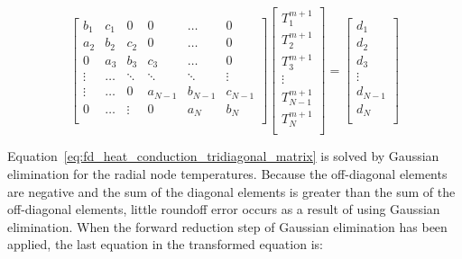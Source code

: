 \begin{equation}
    \label{eq:fd_heat_conduction_tridiagonal_matrix}
    \begin{bmatrix}
        b_{1}   &   c_{1}   &   0       &  0        &   \dots     &   0         \\
        a_{2}   &   b_{2}   &   c_{2}   &  0        &   \dots     &   0         \\
        0       &   a_{3}   &   b_{3}   &  c_{3}    &   \dots     &   0         \\
        \vdots  &   \hdots  &   \ddots  &  \ddots   &   \ddots    &   \vdots    \\
        \vdots  &   \hdots  &   0       &  a_{N-1}  &   b_{N-1}   &   c_{N-1}   \\
        0       &   \hdots  &   \vdots  &   0       &   a_{N}     &     b_{N}   \\  
    \end{bmatrix}
    \begin{bmatrix}
        T_{1}^{m+1}         \\
        T_{2}^{m+1}         \\
        T_{3}^{m+1}         \\
        \vdots              \\
        T_{N-1}^{m+1}       \\
        T_{N}^{m+1}         \\
    \end{bmatrix}
    =
    \begin{bmatrix}
        d_{1}               \\
        d_{2}               \\
        d_{3}               \\
        \vdots              \\
        d_{N-1}             \\
        d_{N}               \\
    \end{bmatrix}
\end{equation}

Equation~\ref{eq:fd_heat_conduction_tridiagonal_matrix} is solved by Gaussian elimination for the
radial node temperatures. Because the off-diagonal elements are negative and the sum of the diagonal
elements is greater than the sum of the off-diagonal elements, little roundoff error occurs as a
result of using Gaussian elimination. When the forward reduction step of Gaussian elimination has
been applied, the last equation in the transformed equation is:


